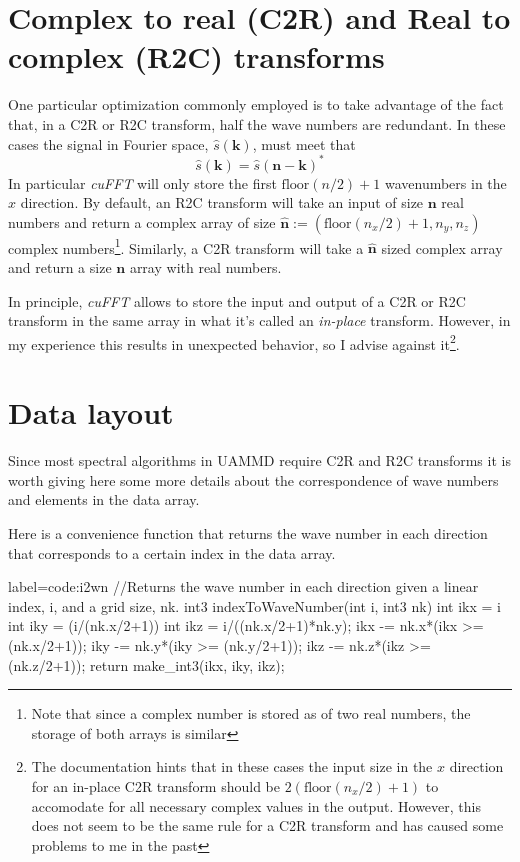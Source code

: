 \documentclass[twoside,openright,titlepage,numbers=noenddot,%
headinclude,footinclude,cleardoublepage=empty,abstract=on,
BCOR=5mm,fontsize=11pt, dvipsnames, paper=b5
]{scrreprt}
\renewcommand{\vec}[1]{\bm{#1}}
\newcommand{\uammd}{\gls{UAMMD}\xspace}
\begin{document}
\section*{Complex to real (C2R) and Real to complex (R2C) transforms}

One particular optimization commonly employed is to take advantage of the fact that, in a C2R or R2C transform, half the wave numbers are redundant. In these cases the signal in Fourier space, $\hat{s}(\vec{k})$, must meet that
\begin{equation}
  \hat{s}(\vec{k}) = \hat{s}(\vec{n} - \vec{k})^*
\end{equation}
In particular \emph{cuFFT} will only store the first $\textrm{floor}(n/2)+1$ wavenumbers in the $x$ direction. By default, an R2C transform will take an input of size $\vec{n}$ real numbers and return a complex array of size $\hat{\vec{n}} := (\textrm{floor}(n_x/2)+1, n_y, n_z)$ complex numbers\footnote{Note that since a complex number is stored as of two real numbers, the storage of both arrays is similar}. Similarly, a C2R transform will take a $\hat{\vec{n}}$ sized complex array and return a size $\vec{n}$ array with real numbers.

In principle, \emph{cuFFT} allows to store the input and output of a C2R or R2C transform in the same array in what it's called an \emph{in-place} transform. However, in my experience this results in unexpected behavior, so I advise against it\footnote{The documentation hints that in these cases the input size in the $x$ direction for an in-place C2R transform should be $2(\textrm{floor}(n_x/2)+1)$ to accomodate for all necessary complex values in the output. However, this does not seem to be the same rule for a C2R transform and has caused some problems to me in the past}.

\section*{Data layout}
Since most spectral algorithms in \uammd require C2R and R2C transforms it is worth giving here some more details about the correspondence of wave numbers and elements in the data array.

Here is a convenience function that returns the wave number in each direction that corresponds to a certain index in the data array.
\begin{code2}{label=code:i2wn}
//Returns the wave number in each direction given a linear index, i, and a grid size, nk.
int3 indexToWaveNumber(int i, int3 nk){
  int ikx = i%
  int iky = (i/(nk.x/2+1))%
  int ikz = i/((nk.x/2+1)*nk.y);
  ikx -= nk.x*(ikx >= (nk.x/2+1));
  iky -= nk.y*(iky >= (nk.y/2+1));
  ikz -= nk.z*(ikz >= (nk.z/2+1));
  return make_int3(ikx, iky, ikz);
}
\end{code2}
\end{document}
